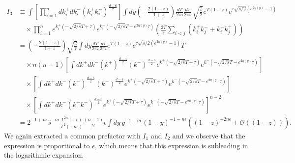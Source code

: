 \documentclass[11pt]{article}
\newcommand{\eps}{\epsilon}
\newcommand{\s}{\hat{s}}
\begin{document}
\begin{align}
    I_3&\equiv\int\left[\prod_{i=1}^n dk_i^+dk_i^-(k_i^+k_i^-)^{\frac{d-6}{2}}\right] \int dy\left(-\frac{2(1-z)}{1+z}\right)\frac{dT}{2\pi i} \frac{d\tau}{2\pi i}\, \sqrt{\frac{\s}{2}}e^{T(1-z)}e^{\tau\sqrt{\s/2}(e^{2\eta(y)}-1)}\nonumber \\
    &\quad\times \prod_{i=1}^n e^{k_i^+(-\sqrt{2/\s}T+\tau)}e^{k_i^-(-\sqrt{2/\s}T-e^{2\eta(y)}\tau)}\left(\frac{2T}{\s}\sum_{i<j}(k_i^+k_j^-+k_i^-k_j^+)\right)\nonumber \\
    &= \left(-\frac{2(1-z)}{1+z}\right)\sqrt{\frac{2}{\s}}\int dy\frac{dT}{2\pi i}\frac{d\tau}{2\pi i}e^{T(1-z)}e^{\tau\sqrt{\s/2}(e^{2\eta(y)}-1)}T\nonumber \\
    &\quad\times n(n-1)\left[\int dk^+dk^-(k^+)^{\frac{d-4}{2}}(k^-)^{\frac{d-6}{2}}e^{k^+(-\sqrt{2/\s}T+\tau)}e^{k^-(-\sqrt{2/\s}T-e^{2\eta(y)}\tau)}\right]\nonumber \\
    &\quad\times \left[\int dk^+dk^-(k^+)^{\frac{d-6}{2}}(k^-)^{\frac{d-4}{2}}e^{k^+(-\sqrt{2/\s}T+\tau)}e^{k^-(-\sqrt{2/\s}T-e^{2\eta(y)}\tau)}\right]\nonumber \\
    &\quad\times \left[\int dk^+dk^-(k^+k^-)^{\frac{d-6}{2}}e^{k^+(-\sqrt{2/\s}T+\tau)}e^{k^-(-\sqrt{2/\s}T-e^{2\eta(y)}\tau)}\right]^{n-2}\nonumber \\
    &= 2^{-1+n\eps}\s^{-n\eps}\frac{\Gamma^{2n}\left(-\epsilon\right)}{\Gamma^2\left(-n\epsilon\right)}\frac{(n-1)}{2}\epsilon\int dy\, y^{-1-n\eps}(1-y)^{-1-n\eps}\left((1-z)^{-2n\eps}+\mathcal{O}((1-z))\right).
\end{align}
We again extracted a common prefactor with $I_1$ and $I_2$ and we observe that the expression is proportional to $\epsilon$, which means that this expression is subleading in the logarithmic expansion. 
\end{document}
